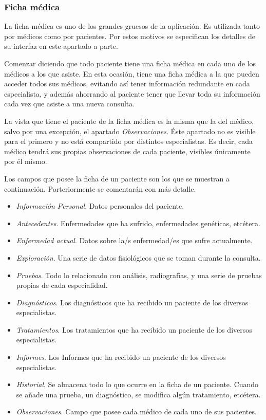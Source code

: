 \documentclass[a4paper,oneside,11pt]{book}
\begin{document}
		
	
	
	\subsubsection{Ficha médica} %
		\label{sub:ficha_medica}
	
		La ficha médica es uno de los grandes gruesos de la aplicación. Es utilizada tanto por médicos como por pacientes. Por estos motivos se especifican los detalles de su interfaz en este apartado a parte.
		
		Comenzar diciendo que todo paciente tiene una ficha médica en cada uno de los médicos a los que asiste. En esta ocasión, tiene una ficha médica a la que pueden acceder todos sus médicos, evitando así tener información redundante en cada especialista, y además ahorrando al paciente tener que llevar toda su información cada vez que asiste a una nueva consulta.
		
		La vista que tiene el paciente de la ficha médica es la misma que la del médico, salvo por una excepción, el apartado \textit{Observaciones}. Éste apartado no es visible para el primero y no está compartido por distintos especialistas. Es decir, cada médico tendrá sus propias observaciones de cada paciente, visibles únicamente por él mismo. 
		
		Los campos que posee la ficha de un paciente son los que se muestran a continuación. Porteriormente se comentarán con más detalle.
		
		\begin{itemize}
			\item \textit{Información Personal}. Datos personales del paciente.
			\item \textit{Antecedentes}. Enfermedades que ha sufrido, enfermedades genéticas, etcétera.
			\item \textit{Enfermedad actual}. Datos sobre la/s enfermedad/es que sufre actualmente.
			\item \textit{Exploración}. Una serie de datos fisiológicos que se toman durante la consulta.
			\item \textit{Pruebas}. Todo lo relacionado con análisis, radiografías, y una serie de pruebas propias de cada especialidad.
			\item \textit{Diagnósticos}. Los diagnósticos que ha recibido un paciente de los diversos especialistas.
			\item \textit{Tratamientos}. Los tratamientos que ha recibido un paciente de los diversos especialistas.
			\item \textit{Informes}. Los Informes que ha recibido un paciente de los diversos especialistas.
			\item \textit{Historial}. Se almacena todo lo que ocurre en la ficha de un paciente. Cuando se añade una prueba, un diagnóstico, se modifica algún tratamiento, etcétera.
			\item \textit{Observaciones}. Campo que posee cada médico de cada uno de sus pacientes.
		\end{itemize}
		
\end{document}
